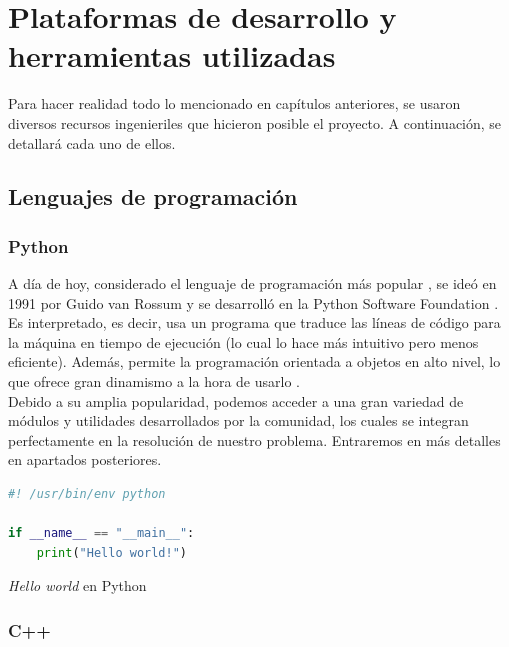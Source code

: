 \chapter{Plataformas de desarrollo y herramientas utilizadas}
\label{cap:capitulo3}

Para hacer realidad todo lo mencionado en capítulos anteriores, se usaron diversos recursos ingenieriles que hicieron posible el proyecto. A continuación, se detallará cada uno de ellos.

\section{Lenguajes de programación}
\label{sec:lenguajes_programacion}

\subsection{Python}
\label{subsec:python}

A día de hoy, considerado el lenguaje de programación más popular \cite{tiobe}, se ideó en 1991 por Guido van Rossum y se desarrolló en la Python Software Foundation \cite{python-history}. Es interpretado, es decir, usa un programa que traduce las líneas de código para la máquina en tiempo de ejecución (lo cual lo hace más intuitivo pero menos eficiente). Además, permite la programación orientada a objetos en alto nivel, lo que ofrece gran dinamismo a la hora de usarlo \cite{python-def} \cite{compiled-vs-interpreted}.\\

Debido a su amplia popularidad, podemos acceder a una gran variedad de módulos y utilidades desarrollados por la comunidad, los cuales se integran perfectamente en la resolución de nuestro problema. Entraremos en más detalles en apartados posteriores.\\

\begin{code}[H]
\begin{lstlisting}[language=Python]
#! /usr/bin/env python

if __name__ == "__main__":
    print("Hello world!")
\end{lstlisting}
\caption[Hello world en Python]{\emph{Hello world} en Python}
\label{cod:helloworld_python}
\end{code}

\subsection{C++}
\label{subsec:cplusplus}

